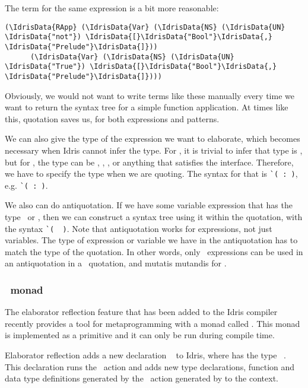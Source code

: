 The  term for the same expression is a bit more reasonable:
\begin{Verbatim}[framesep=2mm, label=\footnotesize{\normalfont{Idris}}, labelposition=topline]
(\IdrisData{RApp} (\IdrisData{Var} (\IdrisData{NS} (\IdrisData{UN} \IdrisData{"not"}) \IdrisData{[}\IdrisData{"Bool"}\IdrisData{,} \IdrisData{"Prelude"}\IdrisData{]}))
      (\IdrisData{Var} (\IdrisData{NS} (\IdrisData{UN} \IdrisData{"True"}) \IdrisData{[}\IdrisData{"Bool"}\IdrisData{,} \IdrisData{"Prelude"}\IdrisData{]})))
\end{Verbatim}

Obviously, we would not want to write terms like these manually every time we want to return
the syntax tree for a simple function application.
At times like this, quotation saves us, for both expressions and patterns.

We can also give the type of the expression we want to elaborate, which becomes
necessary when Idris cannot infer the type. For , it is trivial to
infer that type is , but for , the type can be ,
, , or anything that satisfies the  interface.
Therefore, we have to specify the type when we are quoting. The
syntax for that is \texttt{\`{}( : )},
e.g. \texttt{\`{}( : )}.

We also can do antiquotation. If we have some variable expression  that has the
type \TT\ or , then we can construct a syntax tree using it within the
quotation, with the syntax \texttt{\`{}( ~)}.
Note that antiquotation works for expressions, not just variables. The type of
expression or variable we have in the antiquotation has to match the type of
the quotation. In other words, only \TT\ expressions can be used in an
antiquotation in a \TT\ quotation, and mutatis mutandis for .

\subsubsection{\protect\Elab\ monad}

The elaborator reflection\cite{elabref} feature that has been added to the
Idris compiler recently provides a tool for metaprogramming with a monad called
\Elab.  This monad is implemented as a primitive and it can only be run during
compile time.

Elaborator reflection adds a new declaration
\texttt{}\  to Idris,
where  has the type \ \ty{()}.
This declaration runs the \Elab\ action and adds new type declarations,
function and data type definitions generated by the \Elab\ action generated by
 to the context.

